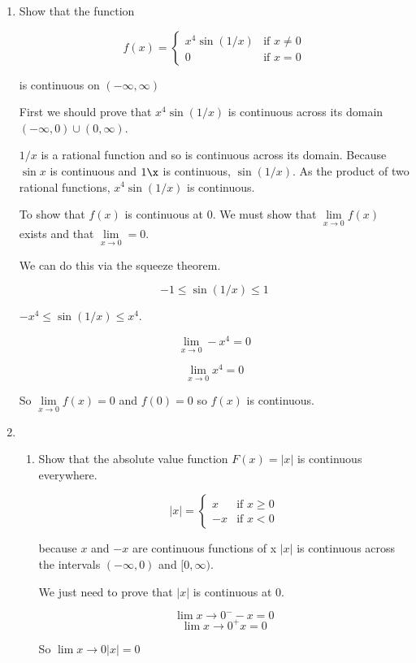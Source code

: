 \documentclass{article}
\begin{document}
\begin{enumerate}
			\item Show that the function

			$$f(x) = \begin{cases}
				x^4 \sin(1/x)	& \text{if } x \neq 0 \\
				0 & \text{if } x = 0
			\end{cases}$$

			is continuous on $(-\infty, \infty)$

			First we should prove that $x^4 \sin(1/x)$ is continuous across
			its domain $(-\infty, 0) \cup (0, \infty)$.

			$1/x$ is a rational function and so is continuous across its domain.
			Because $\sin x$ is continuous and $1\x$ is continuous, $\sin(1/x)$.
			As the product of two rational functions, $x^4 \sin(1/x)$ is continuous.

			To show that $f(x)$ is continuous at 0. We must show that $\lim \limits _{x \to 0} f(x)$
			exists and that $\lim \limits _{x \to 0} = 0$.

			We can do this via the squeeze theorem.

			$$-1 \leq \sin(1/x) \leq 1$$

			$-x^4 \leq \sin(1/x) \leq x^4$.

			$$\lim \limits _{x \to 0} -x^4 = 0$$

			$$\lim \limits _{x \to 0} x^4 = 0$$

			So $\lim \limits _{x \to 0} f(x) = 0$ and $f(0) = 0$ so $f(x)$ is continuous.

			\item 
			\begin{enumerate}
				\item Show that the absolute value function $F(x) = |x|$
					is continuous everywhere.

					$$|x| = \begin{cases}
						x & \text{if } x \geq 0 \\
						-x & \text{if } x < 0
						\end{cases}$$

				because $x$ and $-x$ are continuous functions of x $|x|$ is
				continuous across the intervals $(-\infty, 0)$ and $[0, \infty)$.

				We just need to prove that $|x|$ is continuous at $0$.

				$$\lim \limits {x \to 0^{-}} -x = 0$$
				$$\lim \limits {x \to 0^{+}} x = 0$$
				
				So $\lim \limits {x \to 0} |x| = 0$


\end{enumerate}
\end{enumerate}
\end{document}
